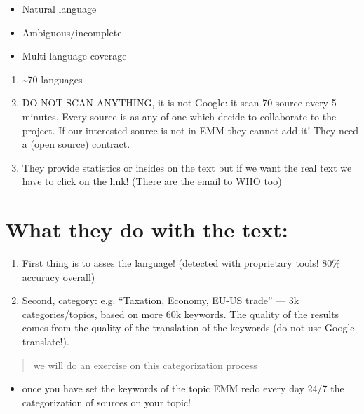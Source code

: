 \documentclass[]{book}
\providecommand{\tightlist}{%
  \setlength{\itemsep}{0pt}\setlength{\parskip}{0pt}}
\theoremstyle{definition}
\theoremstyle{definition}
\theoremstyle{definition}
\theoremstyle{remark}
\begin{document}
\begin{itemize}
\tightlist
\item
  Natural language
\item
  Ambiguous/incomplete
\item
  Multi-language coverage
\end{itemize}

\begin{enumerate}
\def\labelenumi{\arabic{enumi}.}
\setcounter{enumi}{1}
\tightlist
\item
  \textasciitilde{}70 languages
\item
  DO NOT SCAN ANYTHING, it is not Google: it scan 70 source every 5
  minutes. Every source is as any of one which decide to collaborate to
  the project. If our interested source is not in EMM they cannot add
  it! They need a (open source) contract.
\item
  They provide statistics or insides on the text but if we want the real
  text we have to click on the link! (There are the email to WHO too)
\end{enumerate}

\section{What they do with the text:}\label{what-they-do-with-the-text}

\begin{enumerate}
\def\labelenumi{\arabic{enumi}.}
\tightlist
\item
  First thing is to asses the language! (detected with proprietary
  tools! 80\% accuracy overall)
\item
  Second, category: e.g. ``Taxation, Economy, EU-US trade'' --- 3k
  categories/topics, based on more 60k keywords. The quality of the
  results comes from the quality of the translation of the keywords (do
  not use Google translate!).
\end{enumerate}

\begin{quote}
we will do an exercise on this categorization process
\end{quote}

\begin{itemize}
\tightlist
\item
  once you have set the keywords of the topic EMM redo every day 24/7
  the categorization of sources on your topic!
\end{itemize}
\end{document}
